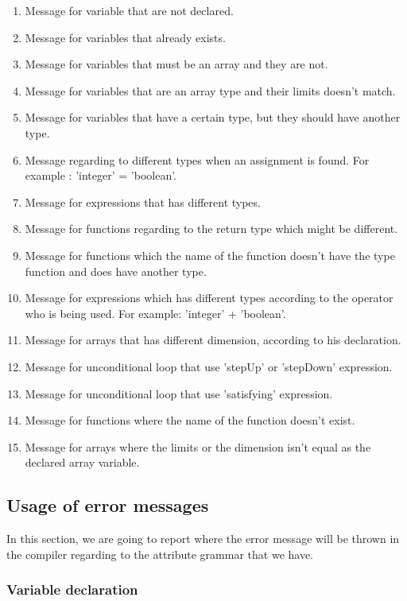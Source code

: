 \documentclass[
  oneside,
  11pt, a4paper,
  footinclude=true,
  headinclude=true,
  cleardoublepage=empty
]{scrbook}
\begin{document}
\begin{enumerate}
\item Message for variable that are not declared.
\item Message for variables that already exists.
\item Message for variables that must be an array and they are not.
\item Message for variables that are an array type and their limits doesn't match.
\item Message for variables that have a certain type, but they should have another type. 
\item Message regarding to different types when an assignment is found. For example : 'integer' = 'boolean'. 
\item Message for expressions that has different types.
\item Message for functions regarding to the return type which might be different.
\item Message for functions which the name of the function doesn't have the type function and does have another type.
\item Message for expressions which has different types according to the operator who is being used. For example: 'integer' + 'boolean'. 
\item Message for arrays that has different dimension, according to his declaration.
\item Message for unconditional loop that use 'stepUp' or 'stepDown' expression.
\item Message for unconditional loop that use 'satisfying' expression.
\item Message for functions where the name of the function doesn't exist.
\item Message for arrays where the limits or the dimension isn't equal as the declared array variable.
\end{enumerate}


\subsection{Usage of error messages}

In this section, we are going to report where the error message will be thrown in the compiler regarding to the attribute grammar that we have.

\subsubsection{Variable declaration}
\end{document}
